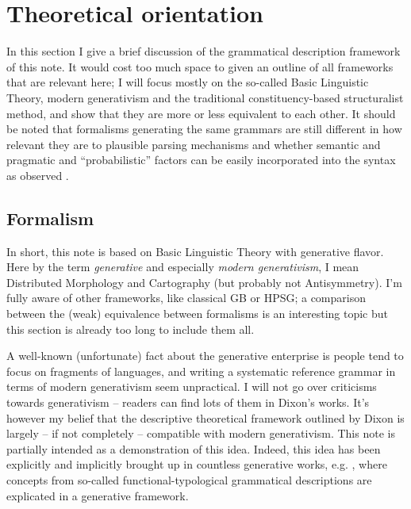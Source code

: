 \documentclass[UTF8, a4paper, oneside, scheme=plain, 12pt]{ctexbook}
\newcommand*{\term}[1]{\emph{#1}}
\begin{document}
\section{Theoretical orientation}

{\small

In this section I give a brief discussion of the grammatical description framework of this note.
It would cost too much space to given an outline of all frameworks that are relevant here; 
I will focus mostly on the so-called Basic Linguistic Theory, 
modern generativism and the traditional constituency-based structuralist method,
and show that they are more or less equivalent to each other.
It should be noted that formalisms generating the same grammars are still different in 
how relevant they are to plausible parsing mechanisms
and whether semantic and pragmatic and ``probabilistic'' factors can be 
easily incorporated into the syntax as observed 
\citep{stabler2013two}.

\subsection{Formalism}

In short, this note is based on Basic Linguistic Theory 
\citep{dixon2009basic1,dixon2010basic2,dixon2012basic3}
with generative flavor.
Here by the term \term{generative}
and especially \term{modern generativism}, 
I mean Distributed Morphology and Cartography
(but probably not Antisymmetry).
I'm fully aware of other frameworks, like classical GB or HPSG;
a comparison between the (weak) equivalence between formalisms is an interesting topic 
but this section is already too long to include them all. 

A well-known (unfortunate) fact about the generative enterprise is 
people tend to focus on fragments of languages,
and writing a systematic reference grammar in terms of modern generativism
seem unpractical.
I will not go over criticisms towards generativism -- 
readers can find lots of them in Dixon's works.
It's however my belief that the descriptive theoretical framework outlined by Dixon 
is largely -- if not completely -- compatible with modern generativism.
This note is partially intended as a demonstration of this idea.
Indeed, this idea has been explicitly and implicitly brought up in countless generative works, 
e.g. \citet{baker1997thematic},
where concepts from so-called functional-typological grammatical descriptions 
are explicated in a generative framework.

}
\end{document}
